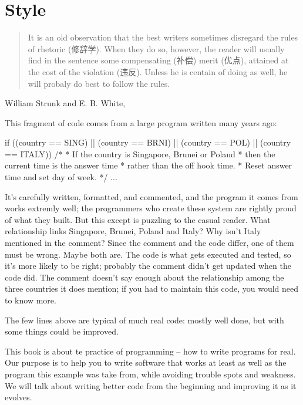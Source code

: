 \chapter{Style}
\label{chap:style}
\begin{quote}
    It is an old observation that the best writers sometimes disregard the
    rules of rhetoric (修辞学). When they do so, however, the reader will
    usually find in the sentence some compensating (补偿) merit (优点),
    attained at the cost of the violation (违反). Unless he is centain of
    doing as well, he will probaly do best to follow the rules.
\end{quote}

\begin{quotesrc}
    William Strunk and E. B. White, 
\end{quotesrc}

This fragment of code comes from a large program written many years ago:
\begin{wellcode}
    if ((country == SING) || (country == BRNI) ||
        (country == POL) || (country == ITALY))
    {
        /*
         * If the country is Singapore, Brunei or Poland
         * then the current time is the answer time 
         * rather than the off hook time.
         * Reset answer time and set day of week.
         */
         ...
    }
\end{wellcode}

It's carefully written, formatted, and commented, and the program it comes
from works extremly well; the programmers who create these system are
rightly proud of what they built. But this except is puzzling to the casual
reader. What relationship links Singapore, Brunei, Poland and Italy? Why
isn't Italy mentioned in the comment? Since the comment and the code
differ, one of them must be wrong. Maybe both are. The code is what gets
executed and tested, so it's more likely to be right; probably the comment
didn't get updated when the code did. The comment doesn't say enough about
the relationship among the three countries it does mention; if you had to
maintain this code, you would need to know more.

The few lines above are typical of much real code: mostly well done, but
with some things could be improved.

This book is about te practice of programming -- how to write programs for
real. Our purpose is to help you to write software that works at least as
well as the program this example was take from, while avoiding trouble
spots and weakness. We will talk about writing better code from the
beginning and improving it as it evolves.


